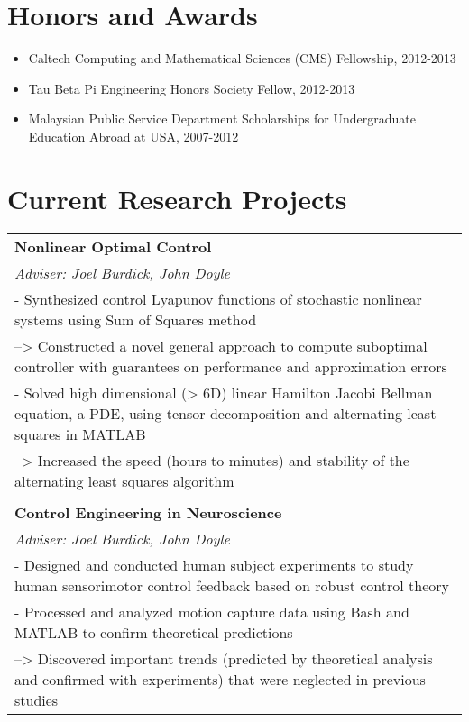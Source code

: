 \documentclass[letterpaper]{article}
\begin{document}
\section*{Honors and Awards}

\begin{itemize}\itemsep1pt \parskip0pt 
\item Caltech Computing and Mathematical Sciences (CMS) Fellowship, 2012-2013
\item Tau Beta Pi Engineering Honors Society Fellow, 2012-2013
\item Malaysian Public Service Department Scholarships for Undergraduate Education Abroad at USA, 2007-2012
\end{itemize}

\section*{Current Research Projects}


\begin{tabularx}{\textwidth}{@{\extracolsep{\fill}} X}
\textbf{Nonlinear Optimal Control}\\
 \textit{Adviser: Joel Burdick, John Doyle}  \\
{- Synthesized control Lyapunov functions of stochastic nonlinear systems
using Sum of Squares method} \\  
{--> Constructed a novel general approach to compute suboptimal controller
with guarantees on performance and approximation errors} \\  
{- Solved high dimensional (> 6D) linear Hamilton Jacobi Bellman equation, a
PDE, using tensor decomposition and alternating least squares in MATLAB} \\  
{--> Increased the speed (hours to minutes) and stability of the alternating
least squares algorithm} \\  \\

\textbf{Control Engineering in Neuroscience}\\
 \textit{Adviser: Joel Burdick, John Doyle}  \\
{- Designed and conducted human subject experiments to study human
sensorimotor control feedback based on robust control theory} \\  
{- Processed and analyzed motion capture data using Bash and MATLAB to
confirm theoretical predictions} \\  
{--> Discovered important trends (predicted by theoretical analysis and
confirmed with experiments) that were neglected in previous studies} 

\end{tabularx}
\end{document}
